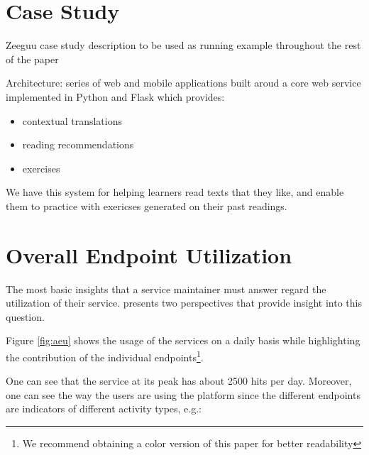 \documentclass[conference]{IEEEtran}
\begin{document}



\section{Case Study}

Zeeguu case study description to be used as running example throughout the rest of the paper

Architecture: series of web and mobile applications built aroud a core web service implemented in Python and Flask which provides: 
\begin{itemize}
  \item contextual translations 
  \item reading recommendations
  \item exercises
\end{itemize}

We have this system for helping learners read texts that they like, and enable them to practice with exericses generated on their past readings.



\section{Overall Endpoint Utilization}

  The most basic insights that a service maintainer must answer regard the utilization of their service. \tool presents two perspectives that provide insight into this question. 


  Figure \ref{fig:aeu} shows the usage of the services on a daily basis while highlighting the contribution of the individual endpoints\footnote{We recommend obtaining a color version of this paper for better readability}. 

  One can see that the service at its peak has about 2500 hits per day. Moreover, one can see the way the users are using the platform since the different endpoints are indicators of different activity types, e.g.: 
\end{document}
